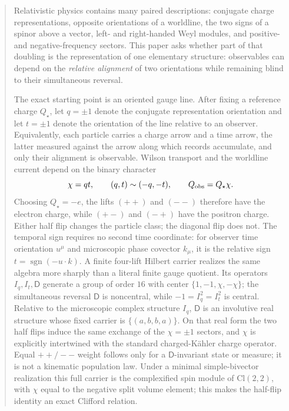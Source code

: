 \documentclass[11pt]{article}
\newcommand{\sgn}{\operatorname{sgn}}
\theoremstyle{definition}\newtheorem{definition}[theorem]{Definition}
\theoremstyle{remark}\newtheorem{remark}[theorem]{Remark}\newtheorem{conjecture}[theorem]{Conjecture}
\begin{document}
\begin{abstract}
Relativistic physics contains many paired descriptions: conjugate charge representations, opposite orientations of a worldline, the two signs of a spinor above a vector, left- and right-handed Weyl modules, and positive- and negative-frequency sectors. This paper asks whether part of that doubling is the representation of one elementary structure: observables can depend on the \emph{relative alignment} of two orientations while remaining blind to their simultaneous reversal.

The exact starting point is an oriented gauge line. After fixing a reference charge $Q_\star$, let $q=\pm1$ denote the conjugate representation orientation and let $t=\pm1$ denote the orientation of the line relative to an observer. Equivalently, each particle carries a charge arrow and a time arrow, the latter measured against the arrow along which records accumulate, and only their alignment is observable. Wilson transport and the worldline current depend on the binary character
\begin{equation*}
 \chi=qt,
 \qquad
 (q,t)\sim(-q,-t),
 \qquad
 Q_{\rm obs}=Q_\star\chi.
\end{equation*}
Choosing $Q_\star=-e$, the lifts $(++ )$ and $(-- )$ therefore have the electron charge, while $(+-)$ and $(-+)$ have the positron charge. Either half flip changes the particle class; the diagonal flip does not. The temporal sign requires no second time coordinate: for observer time orientation $u^\mu$ and microscopic phase covector $k_\mu$, it is the relative sign $t=\sgn(-u\cdot k)$. A finite four-lift Hilbert carrier realizes the same algebra more sharply than a literal finite gauge quotient. Its operators $I_q,I_t,\mathsf D$ generate a group of order $16$ with center $\{1,-1,\chi,-\chi\}$; the simultaneous reversal $\mathsf D$ is noncentral, while $-1=I_q^2=I_t^2$ is central. Relative to the microscopic complex structure $I_q$, $\mathsf D$ is an involutive real structure whose fixed carrier is $\{(a,b,b,a)\}$. On that real form the two half flips induce the same exchange of the $\chi=\pm1$ sectors, and $\chi$ is explicitly intertwined with the standard charged-K\"ahler charge operator. Equal $++/--$ weight follows only for a $\mathsf D$-invariant state or measure; it is not a kinematic population law.
Under a minimal simple-bivector realization this full carrier is the complexified spin module of $\mathrm{Cl}(2,2)$, with $\chi$ equal to the negative split volume element; this makes the half-flip identity an exact Clifford relation.


\end{abstract}
\end{document}
